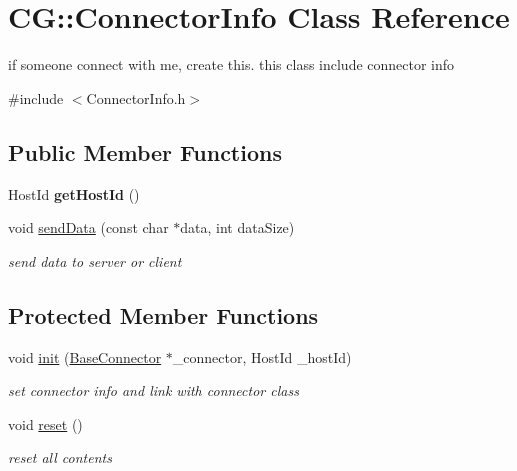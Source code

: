 \hypertarget{class_c_g_1_1_connector_info}{}\section{CG\+:\+:Connector\+Info Class Reference}
\label{class_c_g_1_1_connector_info}


if someone connect with me, create this. this class include connector info  




{\ttfamily \#include $<$Connector\+Info.\+h$>$}

\subsection*{Public Member Functions}
\begin{DoxyCompactItemize}
\item 
\mbox{\label{class_c_g_1_1_connector_info_a52838c3667defe99bd17011a563e55a8}} 
Host\+Id {\bfseries get\+Host\+Id} ()
\item 
void \mbox{\hyperlink{class_c_g_1_1_connector_info_a6d67b0192c2039eba12bf2ca1354a9d9}{send\+Data}} (const char $\ast$data, int data\+Size)
\begin{DoxyCompactList}\small\item\em send data to server or client \end{DoxyCompactList}\end{DoxyCompactItemize}
\subsection*{Protected Member Functions}
\begin{DoxyCompactItemize}
\item 
void \mbox{\hyperlink{class_c_g_1_1_connector_info_ae8e3cecb2e65164b357cab6ad7d60ba2}{init}} (\mbox{\hyperlink{class_c_g_1_1_base_connector}{Base\+Connector}} $\ast$\+\_\+connector, Host\+Id \+\_\+host\+Id)
\begin{DoxyCompactList}\small\item\em set connector info and link with connector class \end{DoxyCompactList}\item 
void \mbox{\hyperlink{class_c_g_1_1_connector_info_af6b5c51df589176c6cb3dc093deabfae}{reset}} ()
\begin{DoxyCompactList}\small\item\em reset all contents \end{DoxyCompactList}\end{DoxyCompactItemize}
